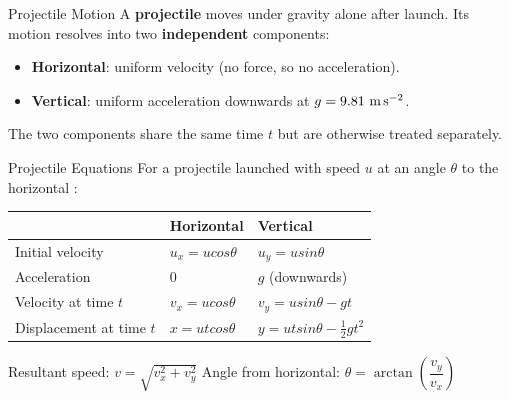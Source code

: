 \begin{definitionbox}{Projectile Motion}
A \textbf{projectile} moves under gravity alone after launch. Its motion resolves into two \textbf{independent} components:
\begin{itemize}[itemsep=3pt]
  \item \textbf{Horizontal}: uniform velocity (no force, so no acceleration).
  \item \textbf{Vertical}: uniform acceleration downwards at $g = 9.81\ \text{m\,s}^{-2}$.
\end{itemize}
The two components share the same time $t$ but are otherwise treated separately.
\end{definitionbox}

\begin{formulabox}{Projectile Equations }
For a projectile launched with speed $u$ at an angle $\theta$ to the horizontal :
\begin{center}
\renewcommand{\arraystretch}{1.5}
\begin{tabular}{@{}lll@{}}
\toprule
 & \textbf{Horizontal} & \textbf{Vertical} \\
\midrule
Initial velocity & $u_x = u cos\theta$ & $u_y = usin\theta$ \\
Acceleration     & $0$ & $g$ (downwards) \\
Velocity at time $t$ & $v_x = u cos\theta$ & $v_y = usin\theta - gt$ \\
Displacement at time $t$ & $x = utcos\theta$ & $y = utsin\theta-\tfrac{1}{2}gt^2$ \\
\bottomrule
\end{tabular}
\end{center}
\vspace{0.5em}
Resultant speed: $v = \sqrt{v_x^2 + v_y^2}$ \qquad
Angle from horizontal: $\theta = \arctan\!\left(\dfrac{v_y}{v_x}\right)$
\end{formulabox}


\vspace{3em}

\def\angle{70} %
\def\v{6}   %
\def\g{9.8} %
\def\r{0.04} %

